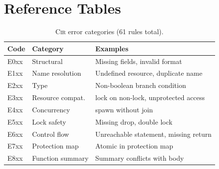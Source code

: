 \documentclass[sigconf]{acmart}
\begin{document}
\appendix

\section{Reference Tables}
\label{app:tables}

\begin{table}[h]
\caption{\textsc{Cir} error categories (61 rules total).}
\label{tab:cir-errors}
\centering\footnotesize
\begin{tabular}{@{}llp{4.0cm}@{}}
\toprule
\textbf{Code} & \textbf{Category} & \textbf{Examples} \\
\midrule
E0xx & Structural      & Missing fields, invalid format \\
E1xx & Name resolution & Undefined resource, duplicate name \\
E2xx & Type            & Non-boolean branch condition \\
E3xx & Resource compat.& \textsf{lock} on non-lock, unprotected access \\
E4xx & Concurrency     & \textsf{spawn} without \textsf{join} \\
E5xx & Lock safety     & Missing \textsf{drop}, double lock \\
E6xx & Control flow    & Unreachable statement, missing \textsf{return} \\
E7xx & Protection map  & \textsf{Atomic} in protection map \\
E8xx & Function summary& Summary conflicts with body \\
\bottomrule
\end{tabular}
\end{table}
\end{document}
